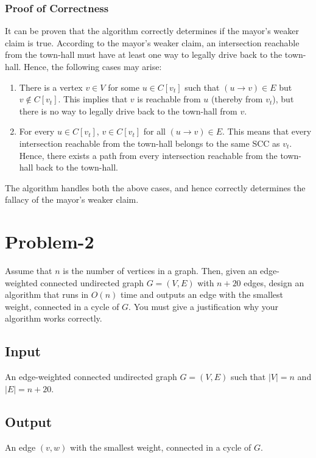 \documentclass[12pt]{report}
\begin{document}
    \subsubsection*{Proof of Correctness}
    It can be proven that the algorithm correctly determines if the mayor's weaker claim is true.
    According to the mayor's weaker claim, an intersection reachable from the town-hall must have at least one way to legally drive back to the town-hall.
    Hence, the following cases may arise:
    \begin{enumerate}
        \item
        There is a vertex $v \in V$ for some $u \in C[v_{t}]$ such that $(u \to v) \in E$ but $v \notin C[v_{t}]$.
        This implies that $v$ is reachable from $u$ (thereby from $v_{t}$), but there is no way to legally drive back to the town-hall from $v$.
        \item
        For every $u \in C[v_{t}]$, $v \in C[v_{t}]$ for all $(u \to v) \in E$.
        This means that every intersection reachable from the town-hall belongs to the same SCC as $v_{t}$.
        Hence, there exists a path from every intersection reachable from the town-hall back to the town-hall.
    \end{enumerate}
    The algorithm handles both the above cases, and hence correctly determines the fallacy of the mayor's weaker claim.

    \pagebreak

    \section*{\huge{Problem-2}}
    Assume that $n$ is the number of vertices in a graph.
    Then, given an edge-weighted connected undirected graph $G = (V, E)$ with $n + 20$ edges, design an algorithm that runs in $O(n)$
    time and outputs an edge with the smallest weight, connected in a cycle of $G$.
    You must give a justification why your algorithm works correctly.

    \subsection*{Input}
    An edge-weighted connected undirected graph $G = (V, E)$ such that $|V| = n$ and $|E| = n + 20$.

    \subsection*{Output}
    An edge $(v, w)$ with the smallest weight, connected in a cycle of $G$.
\end{document}
